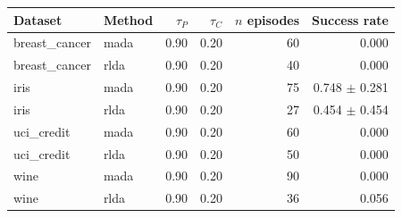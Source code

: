 \begin{tabular}{llrrrr}
\toprule
Dataset & Method & $\tau_P$ & $\tau_C$ & $n$ episodes & Success rate \\
\midrule
breast_cancer & mada & 0.90 & 0.20 & 60 & 0.000 \\
breast_cancer & rlda & 0.90 & 0.20 & 40 & 0.000 \\
iris & mada & 0.90 & 0.20 & 75 & 0.748 $\pm$ 0.281 \\
iris & rlda & 0.90 & 0.20 & 27 & 0.454 $\pm$ 0.454 \\
uci_credit & mada & 0.90 & 0.20 & 60 & 0.000 \\
uci_credit & rlda & 0.90 & 0.20 & 50 & 0.000 \\
wine & mada & 0.90 & 0.20 & 90 & 0.000 \\
wine & rlda & 0.90 & 0.20 & 36 & 0.056 \\
\bottomrule
\end{tabular}
